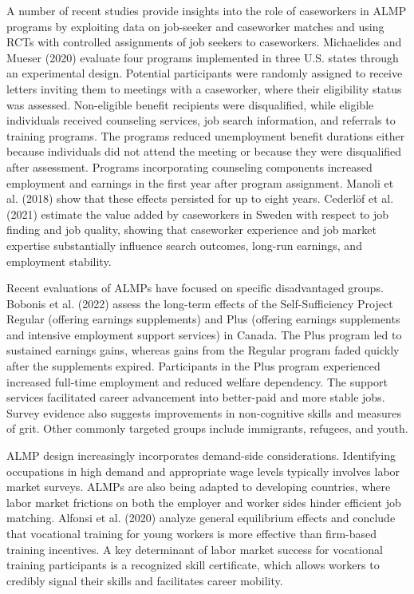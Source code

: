\documentclass{article}
\begin{document}
A number of recent studies provide insights into the role of caseworkers in ALMP programs by exploiting data on job-seeker and caseworker matches and using RCTs with controlled assignments of job seekers to caseworkers. Michaelides and Mueser (2020) evaluate four programs implemented in three U.S. states through an experimental design. Potential participants were randomly assigned to receive letters inviting them to meetings with a caseworker, where their eligibility status was assessed. Non-eligible benefit recipients were disqualified, while eligible individuals received counseling services, job search information, and referrals to training programs. The programs reduced unemployment benefit durations either because individuals did not attend the meeting or because they were disqualified after assessment. Programs incorporating counseling components increased employment and earnings in the first year after program assignment. Manoli et al. (2018) show that these effects persisted for up to eight years. Cederlöf et al. (2021) estimate the value added by caseworkers in Sweden with respect to job finding and job quality, showing that caseworker experience and job market expertise substantially influence search outcomes, long-run earnings, and employment stability.

Recent evaluations of ALMPs have focused on specific disadvantaged groups. Bobonis et al. (2022) assess the long-term effects of the Self-Sufficiency Project Regular (offering earnings supplements) and Plus (offering earnings supplements and intensive employment support services) in Canada. The Plus program led to sustained earnings gains, whereas gains from the Regular program faded quickly after the supplements expired. Participants in the Plus program experienced increased full-time employment and reduced welfare dependency. The support services facilitated career advancement into better-paid and more stable jobs. Survey evidence also suggests improvements in non-cognitive skills and measures of grit. Other commonly targeted groups include immigrants, refugees, and youth.

ALMP design increasingly incorporates demand-side considerations. Identifying occupations in high demand and appropriate wage levels typically involves labor market surveys. ALMPs are also being adapted to developing countries, where labor market frictions on both the employer and worker sides hinder efficient job matching. Alfonsi et al. (2020) analyze general equilibrium effects and conclude that vocational training for young workers is more effective than firm-based training incentives. A key determinant of labor market success for vocational training participants is a recognized skill certificate, which allows workers to credibly signal their skills and facilitates career mobility.
\end{document}
